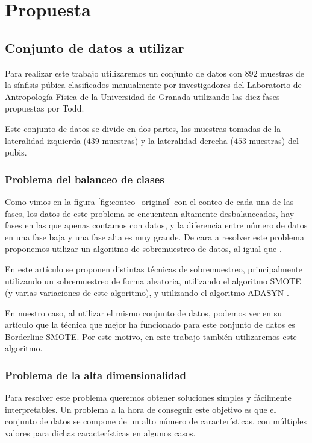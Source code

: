 \section{Propuesta}

\subsection{Conjunto de datos a utilizar}

Para realizar este trabajo utilizaremos un conjunto de datos con $892$ muestras de la sínfisis púbica clasificados manualmente por investigadores del Laboratorio de Antropología Física de la Universidad de Granada utilizando las diez fases propuestas por Todd.

Este conjunto de datos se divide en dos partes, las muestras tomadas de la lateralidad izquierda ($439$ muestras) y la lateralidad derecha ($453$ muestras) del pubis.

\subsubsection{Problema del balanceo de clases}

Como vimos en la figura \ref{fig:conteo_original} con el conteo de cada una de las fases, los datos de este problema se encuentran altamente desbalanceados, hay fases en las que apenas contamos con datos, y la diferencia entre número de datos en una fase baja y una fase alta es muy grande. De cara a resolver este problema proponemos utilizar un algoritmo de sobremuestreo de datos, al igual que  \cite{NSLVOrdAge}.

En este artículo se proponen distintas técnicas de sobremuestreo, principalmente utilizando un sobremuestreo de forma aleatoria, utilizando el algoritmo SMOTE \cite{revisionSMOTE} (y varias variaciones de este algoritmo), y utilizando el algoritmo ADASYN \cite{propuestaADASYN}.

En nuestro caso, al utilizar el mismo conjunto de datos, podemos ver en su artículo que la técnica que mejor ha funcionado para este conjunto de datos es Borderline-SMOTE. Por este motivo, en este trabajo también utilizaremos este algoritmo.

\subsubsection{Problema de la alta dimensionalidad}

Para resolver este problema queremos obtener soluciones simples y fácilmente interpretables. Un problema a la hora de conseguir este objetivo es que el conjunto de datos se compone de un alto número de características, con múltiples valores para dichas características en algunos casos.

